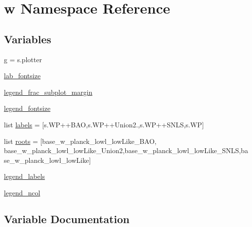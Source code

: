 \hypertarget{namespacew}{}\section{w Namespace Reference}
\label{namespacew}
\subsection*{Variables}
\begin{DoxyCompactItemize}
\item 
\mbox{\hyperlink{namespacew_ab1e50967f3bb8bc599c0e32d536c952f}{g}} = s.\+plotter
\item 
\mbox{\hyperlink{namespacew_a88678e68648b5278fe3522cd047fc46a}{lab\+\_\+fontsize}}
\item 
\mbox{\hyperlink{namespacew_a9fd055bfddd77060a4db9729b0f963d8}{legend\+\_\+frac\+\_\+subplot\+\_\+margin}}
\item 
\mbox{\hyperlink{namespacew_accc9c766f0eb2264d0c2f9364518a02f}{legend\+\_\+fontsize}}
\item 
list \mbox{\hyperlink{namespacew_a55f68c2418f47bd6c7c1cbebb500ff8c}{labels}} = \mbox{[}s.\+WP+\textquotesingle{}+B\+AO\textquotesingle{},s.\+WP+\textquotesingle{}+Union2.\textquotesingle{},s.\+WP+\textquotesingle{}+S\+N\+LS\textquotesingle{},s.\+WP\mbox{]}
\item 
list \mbox{\hyperlink{namespacew_a38d82b401a917a998a088fb727320940}{roots}} = \mbox{[}\textquotesingle{}base\+\_\+w\+\_\+planck\+\_\+lowl\+\_\+low\+Like\+\_\+\+B\+AO\textquotesingle{}, \textquotesingle{}base\+\_\+w\+\_\+planck\+\_\+lowl\+\_\+low\+Like\+\_\+\+Union2\textquotesingle{},\textquotesingle{}base\+\_\+w\+\_\+planck\+\_\+lowl\+\_\+low\+Like\+\_\+\+S\+N\+LS\textquotesingle{},\textquotesingle{}base\+\_\+w\+\_\+planck\+\_\+lowl\+\_\+low\+Like\textquotesingle{}\mbox{]}
\item 
\mbox{\hyperlink{namespacew_ac0108ae140a4e9b8b5d27b0d05b1f45f}{legend\+\_\+labels}}
\item 
\mbox{\hyperlink{namespacew_ad5906fcb9311c42ac28b9312463bc81e}{legend\+\_\+ncol}}
\end{DoxyCompactItemize}


\subsection{Variable Documentation}
\mbox{\label{namespacew_ab1e50967f3bb8bc599c0e32d536c952f}} 
